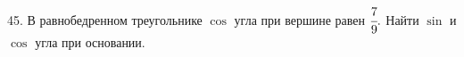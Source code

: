 45. В равнобедренном треугольнике $\cos$ угла при вершине равен $\cfrac{7}{9}.$ Найти $\sin$ и $\cos$ угла при основании.\\
